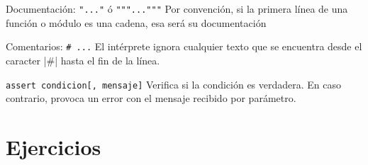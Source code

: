 \begin{referencia_python}

\begin{sintaxis}{Documentación: \lstinline|"..."| ó \lstinline|"""..."""|}
    Por convención, si la primera línea de una función o módulo es una cadena,
    esa será su documentación
\end{sintaxis}

\begin{sintaxis}{Comentarios: \lstinline|# ...|}
    El intérprete ignora cualquier texto que se encuentra desde el caracter
    |#| hasta el fin de la línea.
\end{sintaxis}

\begin{sintaxis}{\lstinline!assert condicion[, mensaje]!}
Verifica si la condición es verdadera.  En caso contrario, provoca un error
con el mensaje recibido por parámetro.
\end{sintaxis}

\end{referencia_python}

\newpage
\section{Ejercicios}

